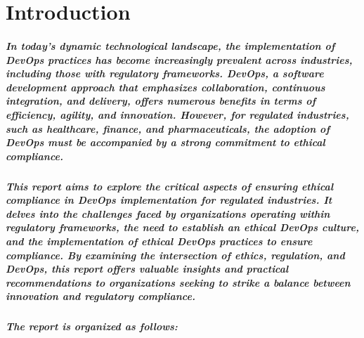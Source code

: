 \chapter{Introduction}

\paragraph{In today's dynamic technological landscape, the implementation of DevOps practices has become increasingly prevalent across industries, including those with regulatory frameworks. DevOps, a software development approach that emphasizes collaboration, continuous integration, and delivery, offers numerous benefits in terms of efficiency, agility, and innovation. However, for regulated industries, such as healthcare, finance, and pharmaceuticals, the adoption of DevOps must be accompanied by a strong commitment to ethical compliance.}
\paragraph{This report aims to explore the critical aspects of ensuring ethical compliance in DevOps implementation for regulated industries. It delves into the challenges faced by organizations operating within regulatory frameworks, the need to establish an ethical DevOps culture, and the implementation of ethical DevOps practices to ensure compliance. By examining the intersection of ethics, regulation, and DevOps, this report offers valuable insights and practical recommendations to organizations seeking to strike a balance between innovation and regulatory compliance.}

\paragraph{The report is organized as follows:}

